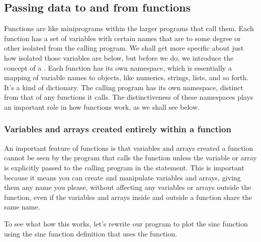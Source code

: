 \documentclass[letterpaper,10pt,english]{sphinxmanual}
\begin{document}
\subsection{Passing data to and from functions}
\label{\detokenize{chap7/chap7_funcs:passing-data-to-and-from-functions}}
\sphinxAtStartPar
Functions are like mini\sphinxhyphen{}programs within the larger programs that call them.  Each function has a set of variables with certain names that are to some degree or other isolated from the calling program.  We shall get more specific about just how isolated those variables are below, but before we do, we introduce the concept of a .  Each function has its own namespace, which is essentially a mapping of variable names to objects, like numerics, strings, lists, and so forth.  It’s a kind of dictionary.  The calling program has its own namespace, distinct from that of any functions it calls.  The distinctiveness of these namespaces plays an important role in how functions work, as we shall see below.


\subsubsection{Variables and arrays created entirely within a function}
\label{\detokenize{chap7/chap7_funcs:variables-and-arrays-created-entirely-within-a-function}}
\sphinxAtStartPar
An important feature of functions is that variables and arrays created  a function cannot be seen by the program that calls the function unless the variable or array is explicitly passed to the calling program in the  statement.  This is important because it means you can create and manipulate variables and arrays, giving them any name you please, without affecting any variables or arrays outside the function, even if the variables and arrays inside and outside a function share the same name.

\sphinxAtStartPar
To see what how this works, let’s rewrite our program to plot the sinc function using the sinc function definition that uses the  function.
\end{document}
